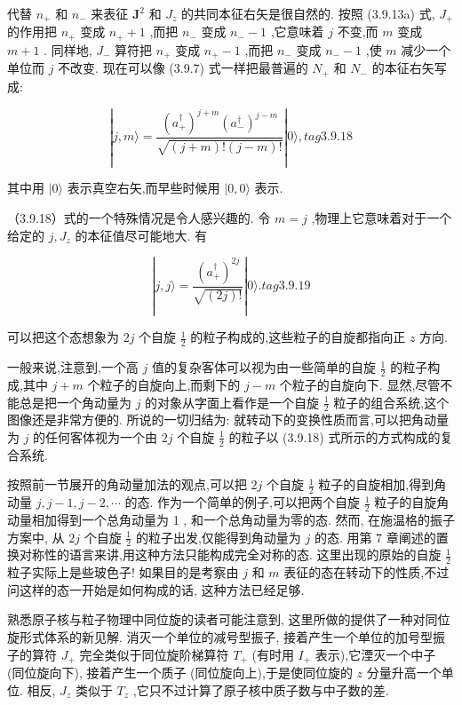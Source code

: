 代替 ${n}_{ + }$ 和 ${n}_{ - }$ 来表征 ${\mathbf{J}}^{2}$ 和 ${J}_{z}$ 的共同本征右矢是很自然的. 按照 (3.9.13a) 式, ${J}_{ + }$ 的作用把 ${n}_{ + }$ 变成 ${n}_{ + } + 1$ ,而把 ${n}_{ - }$ 变成 ${n}_{ - } - 1$ ,它意味着 $j$ 不变,而 $m$ 变成 $m + 1$ . 同样地, ${J}_{ - }$ 算符把 ${n}_{ + }$ 变成 ${n}_{ + } - 1$ ,而把 ${n}_{ - }$ 变成 ${n}_{ - } - 1$ ,使 $m$ 减少一个单位而 $j$ 不改变. 现在可以像 (3.9.7) 式一样把最普遍的 ${N}_{ + }$ 和 ${N}_{ - }$ 的本征右矢写成:

$$
\left| {j, m\rangle = \frac{{\left( {a}_{ + }^{ \dagger }\right) }^{j + m}{\left( {a}_{ - }^{ \dagger }\right) }^{j - m}}{\sqrt{\left( {j + m}\right) !\left( {j - m}\right) !}}}\right| 0\rangle , tag{3. 9.18}
$$

其中用 $|0\rangle$ 表示真空右矢,而早些时候用 $|0,0\rangle$ 表示.

（3.9.18）式的一个特殊情况是令人感兴趣的. 令 $m = j$ ,物理上它意味着对于一个给定的 $j,{J}_{z}$ 的本征值尽可能地大. 有

$$
\left| {j, j\rangle = \frac{{\left( {a}_{ + }^{ \dagger }\right) }^{2j}}{\sqrt{\left( {2j}\right) !}}}\right| 0\rangle . tag{3.9.19}
$$

可以把这个态想象为 ${2j}$ 个自旋 $\frac{1}{2}$ 的粒子构成的,这些粒子的自旋都指向正 $z$ 方向.

一般来说,注意到,一个高 $j$ 值的复杂客体可以视为由一些简单的自旋 $\frac{1}{2}$ 的粒子构成,其中 $j + m$ 个粒子的自旋向上,而剩下的 $j - m$ 个粒子的自旋向下. 显然,尽管不能总是把一个角动量为 $j$ 的对象从字面上看作是一个自旋 $\frac{1}{2}$ 粒子的组合系统,这个图像还是非常方便的. 所说的一切归结为: 就转动下的变换性质而言,可以把角动量为 $j$ 的任何客体视为一个由 ${2j}$ 个自旋 $\frac{1}{2}$ 的粒子以 (3.9.18) 式所示的方式构成的复合系统.

按照前一节展开的角动量加法的观点,可以把 ${2j}$ 个自旋 $\frac{1}{2}$ 粒子的自旋相加,得到角动量 $j, j - 1, j - 2,\cdots$ 的态. 作为一个简单的例子,可以把两个自旋 $\frac{1}{2}$ 粒子的自旋角动量相加得到一个总角动量为 1 , 和一个总角动量为零的态. 然而, 在施温格的振子方案中, 从 ${2j}$ 个自旋 $\frac{1}{2}$ 的粒子出发,仅能得到角动量为 $j$ 的态. 用第 7 章阐述的置换对称性的语言来讲,用这种方法只能构成完全对称的态. 这里出现的原始的自旋 $\frac{1}{2}$ 粒子实际上是些玻色子! 如果目的是考察由 $j$ 和 $m$ 表征的态在转动下的性质,不过问这样的态一开始是如何构成的话, 这种方法已经足够.

熟悉原子核与粒子物理中同位旋的读者可能注意到, 这里所做的提供了一种对同位旋形式体系的新见解. 消灭一个单位的减号型振子, 接着产生一个单位的加号型振子的算符 ${J}_{ + }$ 完全类似于同位旋阶梯算符 ${T}_{ + }$ (有时用 ${I}_{ + }$ 表示),它湮灭一个中子 (同位旋向下), 接着产生一个质子 (同位旋向上),于是使同位旋的 $z$ 分量升高一个单位. 相反, ${J}_{z}$ 类似于 ${T}_{z}$ ,它只不过计算了原子核中质子数与中子数的差.

